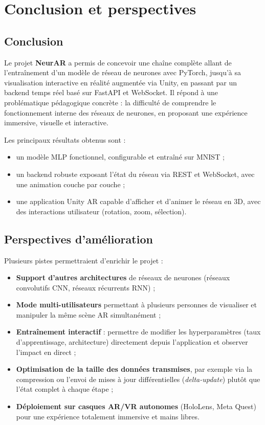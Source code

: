 \documentclass[12pt,a4paper]{report}
\begin{document}
\chapter{Conclusion et perspectives}
\label{chap:conclusion}

\section{Conclusion}

Le projet \textbf{NeurAR} a permis de concevoir une cha\^ine compl\`ete
allant de l'entra\^inement d'un mod\`ele de r\'eseau de neurones avec
PyTorch, jusqu'\`a sa visualisation interactive en r\'ealit\'e augment\'ee
via Unity, en passant par un backend temps r\'eel bas\'e sur FastAPI et
WebSocket. Il r\'epond \`a une probl\'ematique p\'edagogique concr\`ete : la
difficult\'e de comprendre le fonctionnement interne des r\'eseaux de
neurones, en proposant une exp\'erience immersive, visuelle et interactive.

Les principaux r\'esultats obtenus sont :
\begin{itemize}
    \item un mod\`ele MLP fonctionnel, configurable et entra\^in\'e sur MNIST ;
    \item un backend robuste exposant l'\'etat du r\'eseau via REST et
    WebSocket, avec une animation couche par couche ;
    \item une application Unity AR capable d'afficher et d'animer le r\'eseau
    en 3D, avec des interactions utilisateur (rotation, zoom, s\'election).
\end{itemize}

\section{Perspectives d'am\'elioration}

Plusieurs pistes permettraient d'enrichir le projet :

\begin{itemize}
    \item \textbf{Support d'autres architectures} de r\'eseaux de neurones
    (r\'eseaux convolutifs CNN, r\'eseaux r\'ecurrents RNN) ;
    \item \textbf{Mode multi-utilisateurs} permettant \`a plusieurs personnes
    de visualiser et manipuler la m\^eme sc\`ene AR simultan\'ement ;
    \item \textbf{Entra\^inement interactif} : permettre de modifier les
    hyperparam\`etres (taux d'apprentissage, architecture) directement depuis
    l'application et observer l'impact en direct ;
    \item \textbf{Optimisation de la taille des donn\'ees transmises}, par
    exemple via la compression ou l'envoi de mises \`a jour diff\'erentielles
    (\textit{delta-update}) plut\^ot que l'\'etat complet \`a chaque \'etape ;
    \item \textbf{D\'eploiement sur casques AR/VR autonomes} (HoloLens,
    Meta Quest) pour une exp\'erience totalement immersive et mains libres.
\end{itemize}
\end{document}
